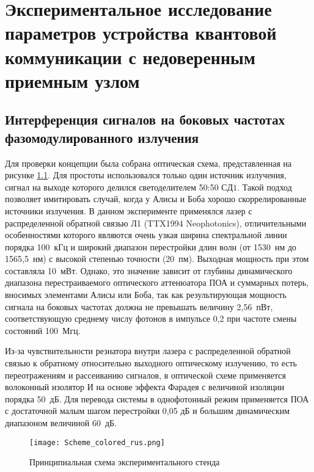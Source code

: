 \chapter{Экспериментальное исследование параметров устройства квантовой коммуникации с недоверенным приемным узлом} \label{ch:ch5}
\section{Интерференция сигналов на боковых частотах фазомодулированного излучения} \label{sec:ch5/sec1}

Для проверки концепции была собрана оптическая схема, представленная на рисунке \ref{fig:RF_sin}. Для простоты использовался только один источник излучения, сигнал на выходе которого делился светоделителем 50:50 $СД1$. Такой подход позволяет имитировать случай, когда у Алисы и Боба хорошо скоррелированные источники излучения. В данном эксперименте применялся лазер с распределенной обратной связью Л1 (TTX1994 Neophotonics), отличительными особенностями которого являются очень узкая ширина спектральной линии порядка 100~кГц и широкий диапазон перестройки длин волн (от 1530~нм до 1565,5~нм) с высокой степенью точности (20~пм). Выходная мощность при этом составляла 10~мВт. Однако, это значение зависит от глубины динамического диапазона перестраиваемого оптического аттенюатора ПОА и суммарных потерь, вносимых элементами Алисы или Боба, так как результирующая мощность сигнала на боковых частотах должна не превышать величину 2,56~пВт, соответствующую среднему числу фотонов в импульсе 0,2 при частоте смены состояний 100~Мгц.   

Из-за чувствительности резнатора внутри лазера с распределенной обратной связью к обратному относительно выходного оптическому излучению, то есть переотражениям и рассеиванию сигналов, в оптической схеме применяется волоконный изолятор И на основе эффекта Фарадея с величиной изоляции порядка 50~дБ. Для перевода системы в однофотонный режим применяется ПОА с достаточной малым шагом перестройки 0,05 дБ и большим динамическим диапазоном величиной 60~дБ.  

 \begin{figure}[ht]
  \centering
  \texttt{[image: Scheme\_colored\_rus.png]}
  \caption{Принципиальная схема экспериментального стенда}
  \label{fig:RF_sin}
\end{figure}

